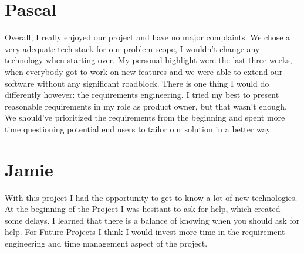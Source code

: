 \section{Pascal}
Overall, I really enjoyed our project and have no major complaints.
We chose a very adequate tech-stack for our problem scope, I wouldn't change any technology when starting over.
My personal highlight were the last three weeks, when everybody got to work on new features and we were able to extend our software without any significant roadblock.
There is one thing I would do differently however: the requirements engineering.
I tried my best to present reasonable requirements in my role as product owner, but that wasn't enough.
We should've prioritized the requirements from the beginning and spent more time questioning potential end users to tailor our solution in a better way.

\section{Jamie}
With this project I had the opportunity to get to know a lot of new technologies. At the beginning of the Project I was hesitant to ask for help, which created some delays.
I learned that there is a balance of knowing when you should ask for help. For Future Projects I think I would invest more time in the requirement engineering and time management
aspect of the project.
